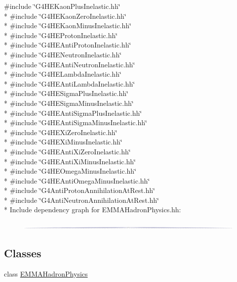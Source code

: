 {\ttfamily \#include \char`\"{}G4\+H\+E\+Kaon\+Plus\+Inelastic.\+hh\char`\"{}}\\*
{\ttfamily \#include \char`\"{}G4\+H\+E\+Kaon\+Zero\+Inelastic.\+hh\char`\"{}}\\*
{\ttfamily \#include \char`\"{}G4\+H\+E\+Kaon\+Minus\+Inelastic.\+hh\char`\"{}}\\*
{\ttfamily \#include \char`\"{}G4\+H\+E\+Proton\+Inelastic.\+hh\char`\"{}}\\*
{\ttfamily \#include \char`\"{}G4\+H\+E\+Anti\+Proton\+Inelastic.\+hh\char`\"{}}\\*
{\ttfamily \#include \char`\"{}G4\+H\+E\+Neutron\+Inelastic.\+hh\char`\"{}}\\*
{\ttfamily \#include \char`\"{}G4\+H\+E\+Anti\+Neutron\+Inelastic.\+hh\char`\"{}}\\*
{\ttfamily \#include \char`\"{}G4\+H\+E\+Lambda\+Inelastic.\+hh\char`\"{}}\\*
{\ttfamily \#include \char`\"{}G4\+H\+E\+Anti\+Lambda\+Inelastic.\+hh\char`\"{}}\\*
{\ttfamily \#include \char`\"{}G4\+H\+E\+Sigma\+Plus\+Inelastic.\+hh\char`\"{}}\\*
{\ttfamily \#include \char`\"{}G4\+H\+E\+Sigma\+Minus\+Inelastic.\+hh\char`\"{}}\\*
{\ttfamily \#include \char`\"{}G4\+H\+E\+Anti\+Sigma\+Plus\+Inelastic.\+hh\char`\"{}}\\*
{\ttfamily \#include \char`\"{}G4\+H\+E\+Anti\+Sigma\+Minus\+Inelastic.\+hh\char`\"{}}\\*
{\ttfamily \#include \char`\"{}G4\+H\+E\+Xi\+Zero\+Inelastic.\+hh\char`\"{}}\\*
{\ttfamily \#include \char`\"{}G4\+H\+E\+Xi\+Minus\+Inelastic.\+hh\char`\"{}}\\*
{\ttfamily \#include \char`\"{}G4\+H\+E\+Anti\+Xi\+Zero\+Inelastic.\+hh\char`\"{}}\\*
{\ttfamily \#include \char`\"{}G4\+H\+E\+Anti\+Xi\+Minus\+Inelastic.\+hh\char`\"{}}\\*
{\ttfamily \#include \char`\"{}G4\+H\+E\+Omega\+Minus\+Inelastic.\+hh\char`\"{}}\\*
{\ttfamily \#include \char`\"{}G4\+H\+E\+Anti\+Omega\+Minus\+Inelastic.\+hh\char`\"{}}\\*
{\ttfamily \#include \char`\"{}G4\+Anti\+Proton\+Annihilation\+At\+Rest.\+hh\char`\"{}}\\*
{\ttfamily \#include \char`\"{}G4\+Anti\+Neutron\+Annihilation\+At\+Rest.\+hh\char`\"{}}\\*
Include dependency graph for E\+M\+M\+A\+Hadron\+Physics.\+hh\+:
\nopagebreak
\begin{figure}[H]
\begin{center}
\leavevmode
\includegraphics[width=350pt]{EMMAHadronPhysics_8hh__incl}
\end{center}
\end{figure}
\subsection*{Classes}
\begin{DoxyCompactItemize}
\item 
class \hyperlink{classEMMAHadronPhysics}{E\+M\+M\+A\+Hadron\+Physics}
\end{DoxyCompactItemize}
